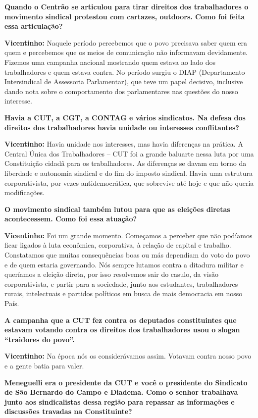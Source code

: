 \textbf{Quando o Centrão se articulou para tirar direitos dos
trabalhadores o movimento sindical protestou com cartazes, outdoors.
Como foi feita essa articulação?}

\textbf{Vicentinho:} Naquele período percebemos que o povo precisava
saber quem era quem e percebemos que os meios de comunicação não
informavam devidamente. Fizemos uma campanha nacional mostrando quem
estava ao lado dos trabalhadores e quem estava contra. No período surgiu
o DIAP (Departamento Intersindical de Assessoria Parlamentar), que teve
um papel decisivo, inclusive dando nota sobre o comportamento dos
parlamentares nas questões do nosso interesse.

\textbf{Havia a CUT, a CGT, a CONTAG e vários sindicatos. Na defesa dos
direitos dos trabalhadores havia unidade ou interesses conflitantes?}

\textbf{Vicentinho:} Havia unidade nos interesses, mas havia diferenças
na prática. A Central Única dos Trabalhadores -- CUT foi a grande
baluarte nessa luta por uma Constituição cidadã para os trabalhadores.
As diferenças se davam em torno da liberdade e autonomia sindical e do
fim do imposto sindical. Havia uma estrutura corporativista, por vezes
antidemocrática, que sobrevive até hoje e que não queria modificações.

\textbf{O movimento sindical também lutou para que as eleições diretas
acontecessem. Como foi essa atuação?}

\textbf{Vicentinho:} Foi um grande momento. Começamos a perceber que não
podíamos ficar ligados à luta econômica, corporativa, à relação de
capital e trabalho. Constatamos que muitas consequências boas ou más
dependiam do voto do povo e de quem estaria governando. Nós sempre
lutamos contra a ditadura militar e queríamos a eleição direta, por isso
resolvemos sair do casulo, da visão corporativista, e partir para a
sociedade, junto aos estudantes, trabalhadores rurais, intelectuais e
partidos políticos em busca de mais democracia em nosso País.

\textbf{A campanha que a CUT fez contra os deputados constituintes que
estavam votando contra os direitos dos trabalhadores usou o slogan
``traidores do povo''.}

\textbf{Vicentinho:} Na época nós os considerávamos assim. Votavam
contra nosso povo e a gente batia para valer.

\textbf{Meneguelli era o presidente da CUT e você o presidente do
Sindicato de São Bernardo do Campo e Diadema. Como o senhor trabalhava
junto aos sindicalistas dessa região para repassar as informações e
discussões travadas na Constituinte?}

